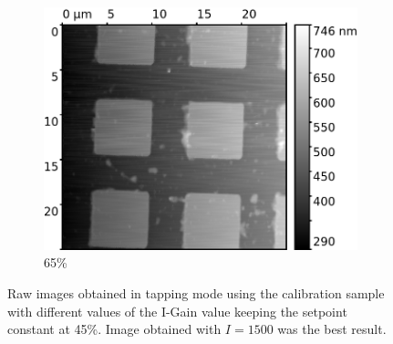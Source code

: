 \documentclass[11pt,a4paper]{article}
\begin{document}
\begin{appendices}
\begin{figure}[H]
\begin{subfigure}[b]{0.48\textwidth}
\includegraphics[width=\textwidth]{tapping_mode_Igain_2000}
\caption{65\%}
\end{subfigure}
\caption{Raw images obtained in tapping mode using the calibration sample with different values of the I-Gain value keeping the setpoint constant at 45\%. Image obtained with $I=1500$ was the best result.}
\end{figure}

\end{appendices}
\end{document}
